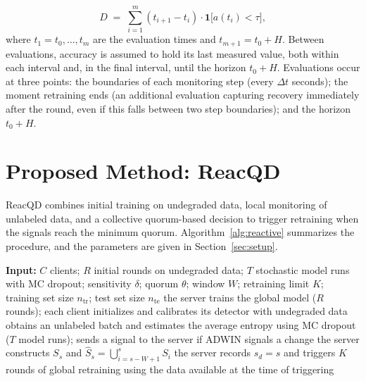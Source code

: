 \documentclass[conference]{IEEEtran}
\begin{document}
\begin{equation}
D \;=\; \sum_{i=1}^{m} (t_{i+1}-t_i)\cdot
\mathbf{1}\big[a(t_i)<\tau\big] ,
\label{eq:downtime}
\end{equation}
where $t_1 = t_0, \dots, t_m$ are the evaluation times and $t_{m+1} = t_0+H$. Between evaluations, accuracy is assumed to hold its last measured value, both within each interval and, in the final interval, until the horizon $t_0+H$. Evaluations occur at three points: the boundaries of each monitoring step (every $\Delta t$ seconds); the moment retraining ends (an additional evaluation capturing recovery immediately after the round, even if this falls between two step boundaries); and the horizon $t_0+H$.

\section{Proposed Method: ReacQD}
ReacQD combines initial training on undegraded data, local monitoring of unlabeled data, and a collective quorum-based decision to trigger retraining when the signals reach the minimum quorum. Algorithm~\ref{alg:reactive} summarizes the procedure, and the parameters are given in Section~\ref{sec:setup}.


\begin{algorithm}[!bh]
\footnotesize
\caption{ReacQD: reactive retraining with local uncertainty detection and collective quorum-based decision-making.}
\label{alg:reactive}
\begin{algorithmic}[1]
\State \textbf{Input:} $C$ clients; $R$ initial rounds on undegraded data; $T$ stochastic model runs with MC dropout; sensitivity $\delta$; quorum $\theta$; window $W$; retraining limit $K$; training set size $n_{\mathrm{tr}}$; test set size $n_{\mathrm{te}}$
\State the server trains the global model ($R$ rounds); each client initializes and calibrates its detector with undegraded data
     \State obtains an unlabeled batch and estimates the average entropy using MC dropout ($T$ model runs); sends a signal to the server if ADWIN signals a change
  \EndFor
  \State the server constructs $S_s$ and $\hat{S}_s = \bigcup_{i=s-W+1}^{s} S_i$
     \State the server records $s_d=s$ and triggers $K$ rounds of global retraining using the data available at the time of triggering
  \EndIf
\EndWhile
\end{algorithmic}
\end{algorithm}
\end{document}
